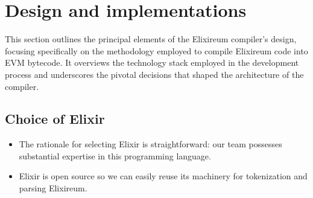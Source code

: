 \section{Design and implementations}
\label{sec:design}

This section outlines the principal elements of the Elixireum compiler's design, focusing specifically on the methodology employed to compile Elixireum code into EVM bytecode. It overviews the technology stack employed in the development process and underscores the pivotal decisions that shaped the architecture of the compiler.


\subsection{Choice of Elixir}


\begin{itemize}
    \item The rationale for selecting Elixir is straightforward: our team possesses substantial expertise in this programming language.
    \item Elixir is open source so we can easily reuse its machinery for tokenization and parsing Elixireum.
\end{itemize}

